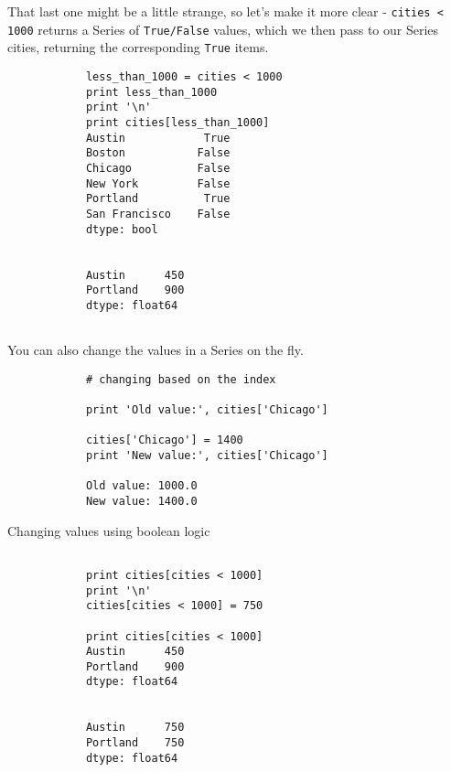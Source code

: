 \documentclass[KSmainSlides.tex]{subfiles}
\begin{document}
	\begin{frame}[fragile]
		
		That last one might be a little strange, so let's make it more clear - \texttt{cities < 1000} returns a Series of \texttt{True/False} values, which we then pass to our Series cities, returning the corresponding \texttt{True} items.
		
	\end{frame}
	\begin{frame}[fragile]
		
		\begin{framed}
			\begin{verbatim}
			less_than_1000 = cities < 1000
			print less_than_1000
			print '\n'
			print cities[less_than_1000]
			Austin            True
			Boston           False
			Chicago          False
			New York         False
			Portland          True
			San Francisco    False
			dtype: bool
			
			
			Austin      450
			Portland    900
			dtype: float64
			
			\end{verbatim}
		\end{framed}
	\end{frame}
	\begin{frame}[fragile]
		
		You can also change the values in a Series on the fly.
		
		\begin{framed}
			\begin{verbatim}
			# changing based on the index
			
			print 'Old value:', cities['Chicago']
			
			cities['Chicago'] = 1400
			print 'New value:', cities['Chicago']
			
			Old value: 1000.0
			New value: 1400.0
			\end{verbatim}
		\end{framed}
	\end{frame}
	\begin{frame}[fragile]	
		Changing values using boolean logic
		\begin{framed}
			\begin{verbatim}
			
			print cities[cities < 1000]
			print '\n'
			cities[cities < 1000] = 750
			
			print cities[cities < 1000]
			Austin      450
			Portland    900
			dtype: float64
			
			
			Austin      750
			Portland    750
			dtype: float64
			\end{verbatim}
		\end{framed}
	\end{frame}
\end{document}
